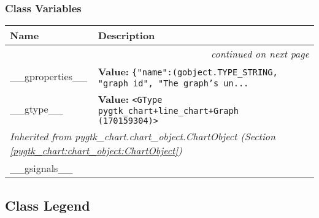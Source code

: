 
  \subsubsection{Class Variables}

    \vspace{-1cm}
\hspace{\varindent}\begin{longtable}{|p{\varnamewidth}|p{\vardescrwidth}|l}
\cline{1-2}
\cline{1-2} \centering \textbf{Name} & \centering \textbf{Description}& \\
\cline{1-2}
\endhead\cline{1-2}\multicolumn{3}{r}{\small\textit{continued on next page}}\\\endfoot\cline{1-2}
\endlastfoot\raggedright \_\-\_\-g\-p\-r\-o\-p\-e\-r\-t\-i\-e\-s\-\_\-\_\- & \raggedright \textbf{Value:} 
{\tt \{"name":(gobject.TYPE\_STRING, "graph id", "The graph's un\texttt{...}}&\\
\cline{1-2}
\raggedright \_\-\_\-g\-t\-y\-p\-e\-\_\-\_\- & \raggedright \textbf{Value:} 
{\tt {\textless}GType pygtk\_chart+line\_chart+Graph (170159304){\textgreater}}&\\
\cline{1-2}
\multicolumn{2}{|l|}{\textit{Inherited from pygtk\_chart.chart\_object.ChartObject \textit{(Section \ref{pygtk_chart:chart_object:ChartObject})}}}\\
\multicolumn{2}{|p{\varwidth}|}{\raggedright \_\_gsignals\_\_}\\
\cline{1-2}
\end{longtable}



\subsection{Class Legend}

